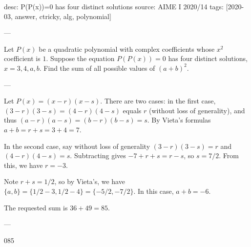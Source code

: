 desc: P(P(x))=0 has four distinct solutions
source: AIME I 2020/14
tags: [2020-03, answer, ctricky, alg, polynomial]

---

Let $P(x)$ be a quadratic polynomial with complex coefficients whose $x^2$ coefficient is $1$. Suppose the equation $P(P(x))=0$ has four distinct solutions, $x=3,4,a,b$. Find the sum of all possible values of $(a+b)^2$.

---

Let $P(x)=(x-r)(x-s)$. There are two cases: in the first case, $(3-r)(3-s)=(4-r)(4-s)$ equals $r$ (without loss of generality), and thus $(a-r)(a-s)=(b-r)(b-s)=s$. By Vieta's formulas $a+b=r+s=3+4=7$.

In the second case, say without loss of generality $(3-r)(3-s)=r$ and $(4-r)(4-s)=s$. Subtracting gives $-7+r+s=r-s$, so $s=7/2$. From this, we have $r=-3$.

Note $r+s=1/2$, so by Vieta's, we have $\{a,b\}=\{1/2-3,1/2-4\}=\{-5/2,-7/2\}$. In this case, $a+b=-6$.

The requested sum is $36+49=85$.

---

085
